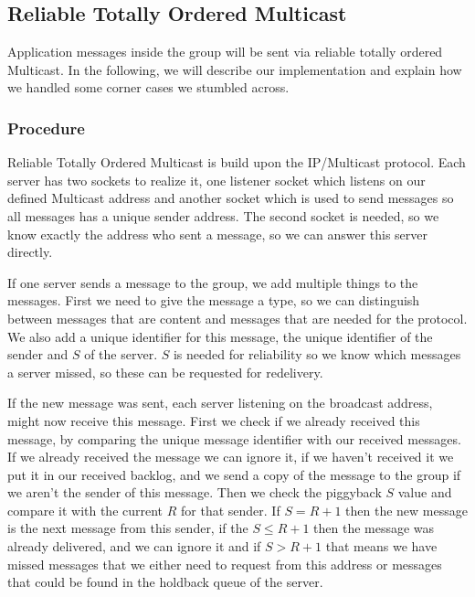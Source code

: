 \documentclass[runningheads]{llncs}
\begin{document}
\subsection{Reliable Totally Ordered Multicast} \label{multicast}

Application messages inside the group will be sent via reliable totally ordered
Multicast. In the following, we will describe our implementation and explain
how we handled some corner cases we stumbled across.

\subsubsection{Procedure} \label{multicastprocedure}

Reliable Totally Ordered Multicast is build upon the IP/Multicast protocol.
Each server has two sockets to realize it, one listener socket which listens on
our defined Multicast address and another socket which is used to send messages
so all messages has a unique sender address. The second socket is needed, so we
know exactly the address who sent a message, so we can answer this server
directly.

If one server sends a message to the group, we add multiple things to the
messages. First we need to give the message a type, so we can distinguish
between messages that are content and messages that are needed for the
protocol. We also add a unique identifier for this message, the unique
identifier of the sender and $S$ of the server. $S$ is needed for reliability
so we know which messages a server missed, so these can be requested for
redelivery.

If the new message was sent, each server listening on the broadcast address,
might now receive this message. First we check if we already received this
message, by comparing the unique message identifier with our received messages.
If we already received the message we can ignore it, if we haven't received it
we put it in our received backlog, and we send a copy of the message to the
group if we aren't the sender of this message. Then we check the piggyback $S$
value and compare it with the current $R$ for that sender. If $S = R + 1$ then
the new message is the next message from this sender, if the $S \leq R + 1$
then the message was already delivered, and we can ignore it and if $S > R + 1$
that means we have missed messages that we either need to request from this
address or messages that could be found in the holdback queue of the server.
\end{document}
